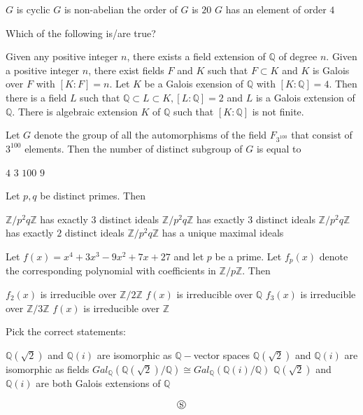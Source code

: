 \documentclass[10pt]{exam}
\newcommand{\Q}{\ensuremath{\mathbb{Q}}}
\newcommand{\Z}{\ensuremath{\mathbb{Z}}}
\begin{document}
\begin{questions}
\begin{checkboxes}
\choice $G$ is cyclic
\choice $G$ is non-abelian
\choice the order of $G$ is $20$
\choice $G$ has an element of order $4$
\end{checkboxes}

\question
Which of the following is/are true?

\begin{checkboxes}
\choice Given any positive integer $n$, there exists a field extension of $\mathbb{Q}$ of degree $n$.
\choice Given a positive integer $n$, there exist fields $F$ and $K$ such that $F \subset K$ and $K$ is Galois over $F$ with $[K:F] = n$.
\choice Let $K$ be a Galois exension of $\mathbb{Q}$ with $[K: \mathbb{Q}] = 4$. Then there is a field $L$ such that $\mathbb{Q} \subset L \subset K, [L: \mathbb{Q}] = 2$ and $L$ is a Galois extension of $\mathbb{Q}$. 
\choice There is algebraic extension $K$ of $\mathbb{Q}$ such that $[K: \mathbb{Q}]$ is not finite.
\end{checkboxes}

\question 
Let $G$ denote the group of all the automorphisms of the field $F_{3^{100}}$ that consist of $3^{100}$ elements. Then the number of distinct subgroup of $G$ is equal to 

\begin{oneparchoices}
\choice $4$
\choice $3$
\choice $100$ 
\choice $9$
\end{oneparchoices}

\question 
Let $p,q$ be distinct primes. Then 

\begin{choices}
\choice $\Z / p^2q \Z $ has exactly $3$ distinct ideals 
\choice $\Z / p^2q \Z $ has exactly $3$ distinct ideals 
\choice $\Z / p^2q \Z $ has exactly $2$ distinct ideals 
\choice $\Z / p^2q \Z $ has a unique maximal  ideals 
\end{choices}

\question 
Let $f(x) = x^4 + 3 x^3 - 9x^2 + 7x + 27$ and let $p$ be a prime. Let $f_p(x)$ denote the corresponding polynomial with coefficients in $\Z / p \Z $. Then 

\begin{checkboxes}
\choice $f_2(x)$ is irreducible over $\Z / 2 \Z$ 
\choice $f(x)$ is irreducible over $\Q$ 
\choice $f_3(x)$ is irreducible over $\Z / 3 \Z$
\choice $f(x)$ is irreducible over $\Z$ 
\end{checkboxes}

\question 
Pick the correct statements:

\begin{checkboxes}
\choice $\Q(\sqrt{2})$ and $\Q(i)$ are isomorphic as $\Q-$vector spaces 
\choice $\Q(\sqrt{2})$ and $\Q(i)$ are isomorphic as fields 
\choice $Gal_{\Q}(\Q(\sqrt{2}) / \Q) \cong  Gal_{\Q}(\Q( i ) / \Q) $  
\choice $\Q(\sqrt{2})$ and $\Q(i)$ are both Galois extensions of $\Q$ 
\end{checkboxes}

\end{questions}
$$\circledS$$
\end{document}
